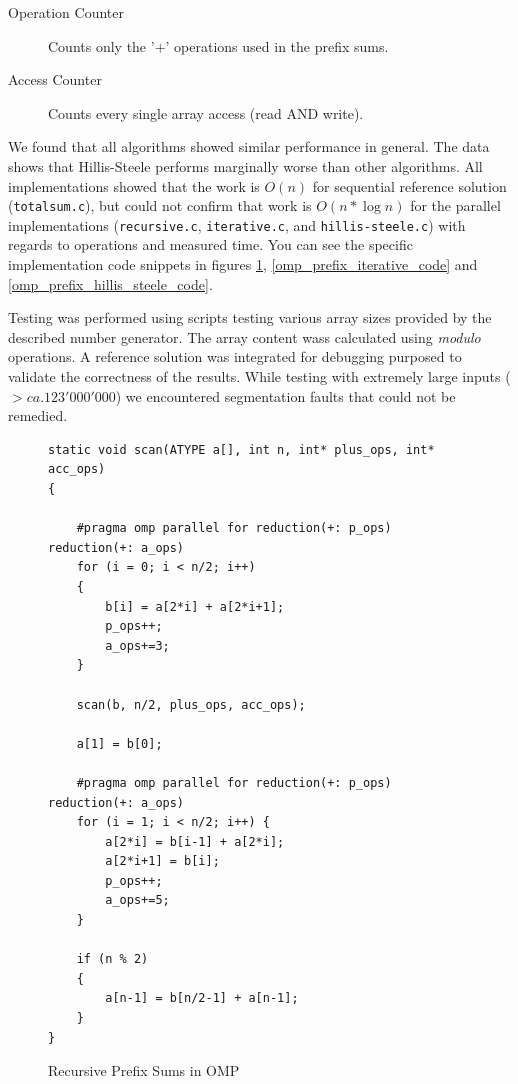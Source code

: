 \documentclass[11pt]{article}
\begin{document}
\begin{description}
\item[Operation Counter] Counts only the '$+$' operations used in the prefix sums. 
\item[Access Counter] Counts every single array access (read AND write).
\end{description}

We found that all algorithms showed similar performance in general. The data shows that Hillis-Steele performs marginally worse than other algorithms. All implementations showed that the work is $O(n)$ for sequential reference solution (\verb=totalsum.c=), but could not confirm that work is $O(n * \log n)$ for the parallel implementations (\verb=recursive.c=, \verb=iterative.c=, and \verb=hillis-steele.c=) with regards to operations and measured time. You can see the specific implementation code snippets in figures \ref{omp_prefix_recursive_code}, \ref{omp_prefix_iterative_code} and \ref{omp_prefix_hillis_steele_code}.

Testing was performed using scripts testing various array sizes provided by the described number generator. The array content wass calculated using \emph{modulo} operations. A reference solution was integrated for debugging purposed to validate the correctness of the results. While testing with extremely large inputs ($> ca. 123'000'000$) we encountered segmentation faults that could not be remedied.

\begin{figure}[H]
\label{omp_prefix_recursive_code}
\caption{Recursive Prefix Sums in OMP}
\begin{lstlisting}
static void scan(ATYPE a[], int n, int* plus_ops, int* acc_ops)
{

	#pragma omp parallel for reduction(+: p_ops) reduction(+: a_ops)
	for (i = 0; i < n/2; i++) 
	{
		b[i] = a[2*i] + a[2*i+1];
		p_ops++;
		a_ops+=3;
	}

	scan(b, n/2, plus_ops, acc_ops);

	a[1] = b[0];

	#pragma omp parallel for reduction(+: p_ops) reduction(+: a_ops)
	for (i = 1; i < n/2; i++) {
		a[2*i] = b[i-1] + a[2*i];
		a[2*i+1] = b[i];
		p_ops++;
		a_ops+=5;
	}

	if (n % 2)
	{
		a[n-1] = b[n/2-1] + a[n-1];
	}
}
\end{lstlisting}
\end{figure}
\end{document}
